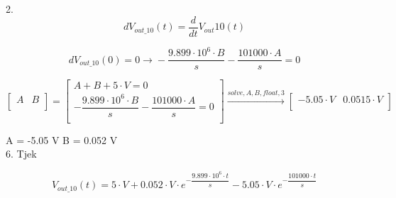 2. \begin{equation}
 dV_{out\_10} \left(t\right) = \dfrac{d}{dt}V_{out}{10}(t)
\end{equation}
 
\begin{equation}
	dV_{out\_10}  \left(0\right)  = 0 \xrightarrow{}  -\dfrac{9.899\cdot 10^{6}\cdot B}{s}-\dfrac{101000\cdot A}{s} = 0
\end{equation}

\begin{equation}
	\begin{bmatrix}
		A &B \\
	\end{bmatrix}
	 = 
	\begin{bmatrix}
		A+B+5\cdot V = 0 \\
		 -\dfrac{9.899\cdot 10^{6}\cdot B}{s}-\dfrac{101000\cdot A}{s} = 0 \\
	\end{bmatrix}
	 \xrightarrow{solve, A, B, float, 3} 
	\begin{bmatrix}
		 -5.05\cdot V &0.0515\cdot V \\
	\end{bmatrix}
\end{equation}

A = -5.05 V
B = 0.052 V \\

6. Tjek

\begin{equation}
	V_{out\_10} \left(t\right)  = 5\cdot V+0.052\cdot V\cdot e^{ -\dfrac{9.899\cdot 10^{6}\cdot t}{s}}-5.05\cdot V\cdot e^{ -\dfrac{101000\cdot t}{s}}
	\label{specifik10k}
\end{equation}

 